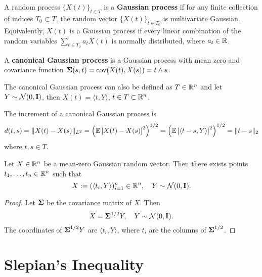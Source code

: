 \begin{definition}
	A random process \(\{X(t)\}_{t\in T}\) is a \textbf{Gaussian process} if for any finite collection of indices \(T_{0}\subset T\), the random vector \(\{X(t)\}_{t\in T_{0}}\) is multivariate Gaussian. Equivalently, \(X(t)\) is a Gaussian process if every linear combination of the random variables \(\sum_{t\in T_{0}}a_{t}X(t)\) is normally distributed, where \(a_{t}\in\mathbb{R}\).
\end{definition}

\begin{definition}
	A \textbf{canonical Gaussian process} is a Gaussian process with mean zero and covariance function \(\boldsymbol{\Sigma}(s,t)=\operatorname{cov}(X(t),X(s))=t\wedge s\).
\end{definition}

\begin{remark}
	The canonical Gaussian process can also be defined as \(T\in\mathbb{R}^{n}\) and let \(Y\sim\mathcal{N}(0,\mathbf{I})\), then \(X(t)=\langle t,Y\rangle\), \(t\in T\subset\mathbb{R}^{n}\).
\end{remark}

The increment of a canonical Gaussian process is
\begin{equation*}
	d(t,s)=\|X(t)-X(s)\|_{L^{2}}=\left(\mathbb{E}\left[X(t)-X(s)\right]^{2}\right)^{1/2}=\left(\mathbb{E}\left[\langle t-s,Y\rangle\right]^{2}\right)^{1/2}=\|t-s\|_{2}
\end{equation*}
where \(t,s\in T\).

\begin{lemma}
	Let \(X\in\mathbb{R}^{n}\) be a mean-zero Gaussian random vector. Then there exists points \(t_{1},\ldots,t_{n}\in\mathbb{R}^{n}\) such that
	\begin{equation*}
		X:=(\langle t_{i},Y\rangle)_{i=1}^{n}\in\mathbb{R}^{n},\quad Y\sim\mathcal{N}(0,\mathbf{I}).
	\end{equation*}
\end{lemma}

\begin{proof}
	Let \(\boldsymbol{\Sigma}\) be the covariance matrix of \(X\). Then
	\begin{equation*}
		X=\boldsymbol{\Sigma}^{1/2}Y,\quad Y\sim\mathcal{N}(0,\mathbf{I}).
	\end{equation*}
	The coordinates of \(\boldsymbol{\Sigma}^{1/2}Y\) are \(\langle t_{i},Y\rangle\), where \(t_{i}\) are the columns of \(\boldsymbol{\Sigma}^{1/2}\).
\end{proof}

\section{Slepian's Inequality}

